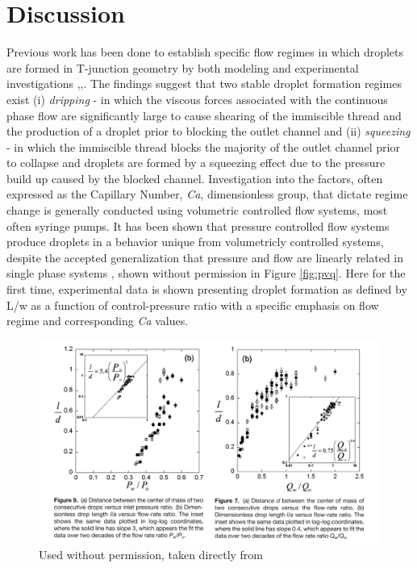 \clearpage

\section{Discussion}

Previous work has been done to establish specific flow regimes in which droplets are formed in T-junction geometry by both modeling and experimental investigations \cite{Abate2012a},\cite{DeMenech2008},\cite{Garstecki2006}. The findings suggest that two stable droplet formation regimes exist (i) \emph{dripping} - in which the viscous forces associated with the continuous phase flow are significantly large to cause shearing of the immiscible thread and the production of a droplet prior to blocking the outlet channel and (ii) \emph{squeezing} - in which the immiscible thread blocks the majority of the outlet channel prior to collapse and droplets are formed by a squeezing effect due to the pressure build up caused by the blocked channel. Investigation into the factors, often expressed as the Capillary Number, \emph{Ca}, dimensionless group, that dictate regime change is generally conducted using volumetric controlled flow systems, most often syringe pumps. It has been shown that pressure controlled flow systems produce droplets in a behavior unique from volumetricly controlled systems, despite the accepted generalization that pressure and flow are linearly related in single phase systems \cite{Ward2005}, shown without permission in Figure \vref{fig:pvq}. Here for the first time, experimental data is shown presenting droplet formation as defined by L/w as a function of control-pressure ratio with a specific emphasis on flow regime and corresponding \emph{Ca} values.

\begin{figure}[h]
\centering 
\includegraphics[width=01.0\columnwidth]{pvq.PNG} 
\caption[Droplet Length as a Function of Applied Control Pressure Ratio]{Used without permission, taken directly from \cite{Ward2005} }
\label{fig:pvq} 
\end{figure}

